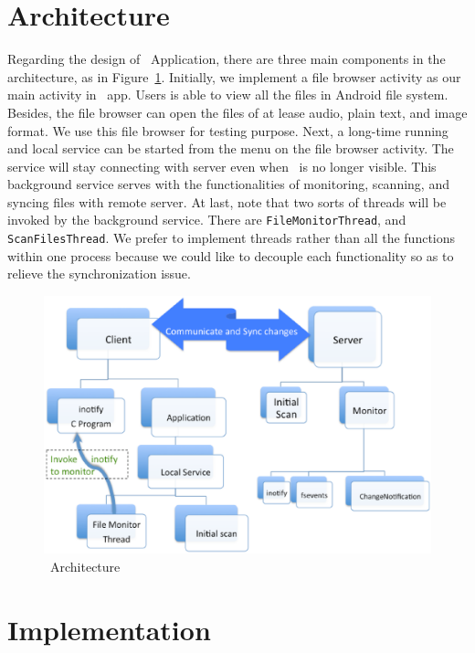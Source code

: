 \section{Architecture}
\label{sec:Architecture}
Regarding the design of \teledroid\ Application, there are three main components in the architecture, as in 
Figure~\ref{fig:architecture}. Initially, we implement a file browser activity as our main activity in \teledroid\ app. 
Users is able to view all the files in Android file system. Besides, the file browser can open the files of at lease 
audio, plain text, and image format. We use this file browser for testing purpose. Next, a long-time running and local 
service can be started from the menu on the file browser activity. The service will stay connecting with server even when 
\teledroid\ is no longer visible. This background service serves with the functionalities of monitoring, scanning, and 
syncing files with remote server. At last, note that two sorts of threads will be invoked by the background service. 
There are \verb+FileMonitorThread+, and \verb+ScanFilesThread+. We prefer to implement threads rather than all the 
functions within one process because we could like to decouple each functionality so as to relieve the synchronization 
issue. 

\begin{figure}[htp]
\centering
\includegraphics[scale=0.5]{architecture}
\caption{\teledroid\ Architecture}\label{fig:architecture}
\end{figure}

\section{Implementation}
\label{sec:Implementation}
